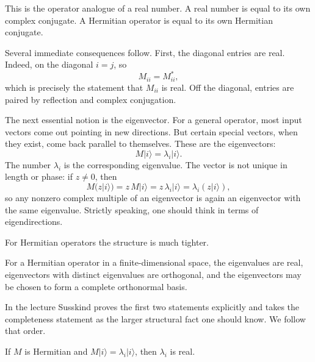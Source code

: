 This is the operator analogue of a real number. A real number is equal to its own complex conjugate. A Hermitian operator is equal to its own Hermitian conjugate.

Several immediate consequences follow. First, the diagonal entries are real. Indeed, on the diagonal \(i=j\), so
\begin{equation}
M_{ii}=M_{ii}^*,
\end{equation}
which is precisely the statement that \(M_{ii}\) is real. Off the diagonal, entries are paired by reflection and complex conjugation.

The next essential notion is the eigenvector. For a general operator, most input vectors come out pointing in new directions. But certain special vectors, when they exist, come back parallel to themselves. These are the eigenvectors:
\begin{equation}
M|i\rangle=\lambda_i |i\rangle.
\end{equation}
The number \(\lambda_i\) is the corresponding eigenvalue. The vector is not unique in length or phase: if \(z\neq 0\), then
\begin{equation}
M(z|i\rangle)=z\,M|i\rangle=z\,\lambda_i |i\rangle=\lambda_i (z|i\rangle),
\end{equation}
so any nonzero complex multiple of an eigenvector is again an eigenvector with the same eigenvalue. Strictly speaking, one should think in terms of eigendirections.

For Hermitian operators the structure is much tighter.

\begin{theorem}
For a Hermitian operator in a finite-dimensional space, the eigenvalues are real, eigenvectors with distinct eigenvalues are orthogonal, and the eigenvectors may be chosen to form a complete orthonormal basis.
\end{theorem}

In the lecture Susskind proves the first two statements explicitly and takes the completeness statement as the larger structural fact one should know. We follow that order.

\begin{proposition}
If \(M\) is Hermitian and \(M|i\rangle=\lambda_i |i\rangle\), then \(\lambda_i\) is real.
\end{proposition}

